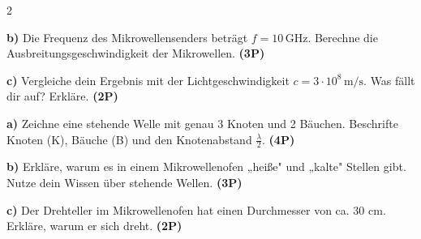 \documentclass[11pt,a4paper]{article}
\begin{document}
\begin{multicols}{2}
\begin{tcolorbox}[colback=white,colframe=black,coltitle=black,colbacktitle=white,
    title=\textbf{3: Wellenlängenbestimmung mit Mikrowellen}]
\vspace{2.8cm}

\textbf{b)} Die Frequenz des Mikrowellensenders beträgt $f = 10\,\mathrm{GHz}$. Berechne die Ausbreitungsgeschwindigkeit der Mikrowellen. \textbf{(3P)}

\vspace{2.8cm}

\textbf{c)} Vergleiche dein Ergebnis mit der Lichtgeschwindigkeit $c = 3 \cdot 10^8\,\mathrm{m/s}$. Was fällt dir auf? Erkläre. \textbf{(2P)}

\vspace{2cm}

\end{tcolorbox}

\begin{tcolorbox}[colback=white,colframe=black,coltitle=black,colbacktitle=white,
    title=\textbf{4: Anwendung und Transfer}]

\textbf{a)} Zeichne eine stehende Welle mit genau 3 Knoten und 2 Bäuchen. Beschrifte Knoten (K), Bäuche (B) und den Knotenabstand $\frac{\lambda}{2}$. \textbf{(4P)}

\vspace{0.3cm}
\begin{center}
\end{center}

\vspace{0.3cm}

\textbf{b)} Erkläre, warum es in einem Mikrowellenofen „heiße" und „kalte" Stellen gibt. Nutze dein Wissen über stehende Wellen. \textbf{(3P)}

\vspace{2.5cm}

\textbf{c)} Der Drehteller im Mikrowellenofen hat einen Durchmesser von ca. 30 cm. Erkläre, warum er sich dreht. \textbf{(2P)}

\vspace{2cm}

\end{tcolorbox}

\end{multicols}
\end{document}
